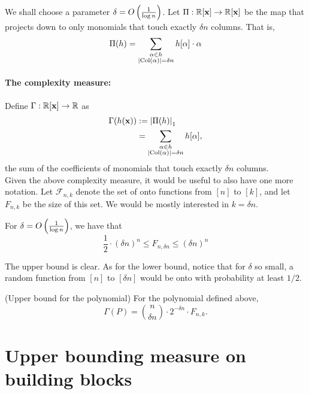 We shall choose a parameter $\delta  = O\left(\frac{1}{\log n}\right)$. Let $\Pi:\mathbb{R}[\mathbf{x}] \rightarrow \mathbb{R}[\mathbf{x}]$ be the map that projects down to only monomials that touch exactly $\delta n$ columns. That is,
\[
  \Pi(h) = \sum_{\substack{\alpha \in h \\ \left|\operatorname{Col}(\alpha)\right| = \delta n}} h[\alpha] \cdot \alpha
\]

\paragraph{The complexity measure:} Define $\Gamma:\mathbb{R}[\mathbf{x}] \rightarrow \mathbb{R}$ as
\begin{align*}
  \Gamma(h(\mathbf{x})) & := \left|\Pi(h)\right|_1 \\
                   & = \sum_{\substack{\alpha \in h \\ \left|\operatorname{Col}(\alpha)\right| = \delta n}} h[\alpha],
\end{align*}
the sum of the coefficients of monomials that touch exactly $\delta n$ columns. \\

Given the above complexity measure, it would be useful to also have one more notation. Let $\mathcal{F}_{n,k}$ denote the set of onto functions from $[n]$ to $[k]$, and let $F_{n,k}$ be the size of this set. We would be mostly interested in $k = \delta n$.

\begin{proposition}\label{prop:bound-on-onto-fns}
  For $\delta = O\left(\frac{1}{\log n}\right)$, we have that
  \[
    \frac{1}{2}\cdot (\delta n)^n \leq  F_{n,\delta n} \leq (\delta n)^n
  \]
\end{proposition}
\begin{proof-sketch}
  The upper bound is clear. As for the lower bound, notice that for $\delta$ so small, a random function from $[n]$ to $[\delta n]$ would be onto with probability at least $1/2$. 
\end{proof-sketch}

\begin{lemmawp}(Upper bound for the polynomial) \label{lemma:monVPVNP-ub-for-poly} For the polynomial defined above, 
  \[
    \Gamma(P) = \binom{n}{\delta n} \cdot  2^{-\delta n} \cdot F_{n,k}. 
  \]
\end{lemmawp}

\section{Upper bounding measure on building blocks}

